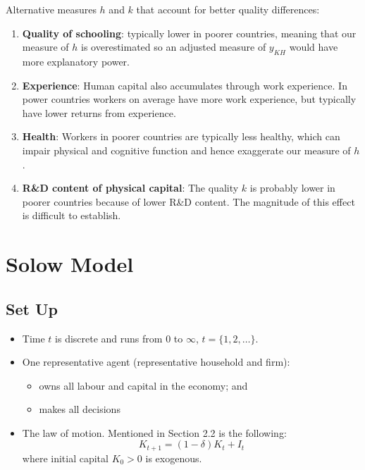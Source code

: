 \documentclass[11pt]{article}
\begin{document}
Alternative measures $h$ and $k$ that account for better quality differences:
\begin{enumerate}
    \item \textbf{Quality of schooling}: typically lower in poorer countries, meaning that our measure of $h$ is overestimated so an adjusted measure of $y_{KH}$ would have more explanatory power.
    \item \textbf{Experience}: Human capital also accumulates through work experience. In power countries workers on average have more work experience, but typically have lower returns from experience.
    \item \textbf{Health}: Workers in poorer countries are typically less healthy, which can impair physical and cognitive function and hence exaggerate our measure of $h$.
    \item \textbf{R\&D content of physical capital}: The quality $k$ is probably lower in poorer countries because of lower R\&D content. The magnitude of this effect is difficult to establish.
\end{enumerate}

\section{Solow Model}
\subsection*{Set Up}
\begin{shaded}
\begin{itemize}
    \item Time $t$ is discrete and runs from 0 to $\infty$, $t=\{1, 2, \ldots\}$.
    \item One representative agent (representative household and firm):
    \begin{itemize}
        \item owns all labour and capital in the economy; and
        \item makes all decisions
    \end{itemize}
    \item The law of motion. Mentioned in Section 2.2 is the following:
    \begin{equation}
        \label{capital stock}
        K_{t+1} = (1-\delta)K_t + I_t
    \end{equation}
    where initial capital $K_0>0$ is exogenous.
\end{itemize}
\end{shaded}
\end{document}
